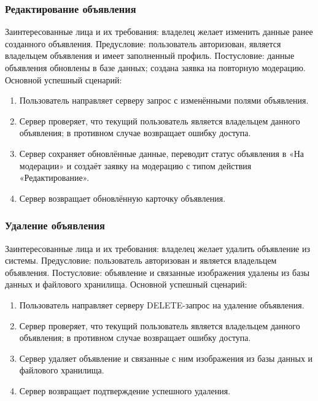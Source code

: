 \subsubsection{Редактирование объявления}
Заинтересованные лица и их требования: владелец желает изменить данные ранее созданного объявления.
Предусловие: пользователь авторизован, является владельцем объявления и имеет заполненный профиль.
Постусловие: данные объявления обновлены в базе данных; создана заявка на повторную модерацию.
Основной успешный сценарий:
\begin{enumerate}
\item Пользователь направляет серверу запрос с изменёнными полями объявления.
\item Сервер проверяет, что текущий пользователь является владельцем данного объявления; в противном случае возвращает ошибку доступа.
\item Сервер сохраняет обновлённые данные, переводит статус объявления в «На модерации» и создаёт заявку на модерацию с типом действия «Редактирование».
\item Сервер возвращает обновлённую карточку объявления.
\end{enumerate}

\subsubsection{Удаление объявления}
Заинтересованные лица и их требования: владелец желает удалить объявление из системы.
Предусловие: пользователь авторизован и является владельцем объявления.
Постусловие: объявление и связанные изображения удалены из базы данных и файлового хранилища.
Основной успешный сценарий:
\begin{enumerate}
\item Пользователь направляет серверу DELETE-запрос на удаление объявления.
\item Сервер проверяет, что текущий пользователь является владельцем данного объявления; в противном случае возвращает ошибку доступа.
\item Сервер удаляет объявление и связанные с ним изображения из базы данных и файлового хранилища.
\item Сервер возвращает подтверждение успешного удаления.
\end{enumerate}

